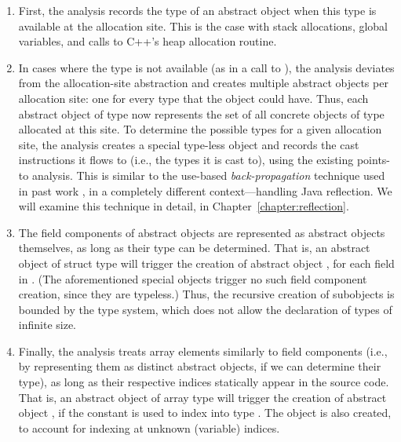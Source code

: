 \begin{enumerate}
\setlength\itemsep{0.5em}
\item First, the analysis records the type of an abstract object when this type is
  available at the allocation site. This is the case with stack
  allocations, global variables, and calls to C++'s 
  heap allocation routine.
\item In cases where the type is not available (as in a call to
  ), the analysis deviates from the allocation-site
  abstraction and creates multiple abstract objects per allocation
  site: one for every type that the object could have. Thus, each
  abstract object of type  now represents the set of all
  concrete objects of type  allocated at this site. To
  determine the possible types for a given allocation site, the
  analysis creates a special type-less object and records the cast
  instructions it flows to (i.e., the types it is cast to), using the
  existing points-to analysis. This is similar to the use-based
  \emph{back-propagation} technique used in past work
  \cite{ecoop/LiTSX14,aplas/LivshitsWL05,aplas/SmaragdakisBKB15}, in a
  completely different context---handling Java reflection.  We will
  examine this technique in detail, in
  Chapter~\ref{chapter:reflection}.
\item The field components of abstract objects are represented as
  abstract objects themselves, as long as their type can be
  determined. That is, an abstract object  of struct type
   will trigger the creation of abstract object
  , for each field  in
  . (The aforementioned special objects trigger no such field
  component creation, since they are typeless.)
  Thus, the recursive creation of subobjects is bounded by the type
  system, which does not allow the declaration of types of infinite
  size.
\item Finally, the analysis treats array elements similarly to
  field components (i.e., by representing them as distinct abstract
  objects, if we can determine their type), as long as their respective
  indices statically appear in the source code. That is, an abstract
  object  of array type \code{[T$\times$N]} will trigger the
  creation of abstract object , if the constant 
  is used to index into type \code{[T$\times$N]}. The object
   is also created, to account for indexing at unknown
  (variable) indices.
\end{enumerate}

